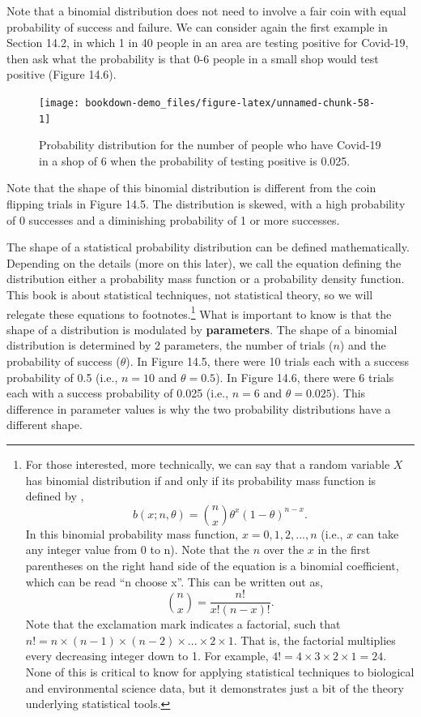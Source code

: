 \documentclass[
]{scrbook}
\begin{document}
Note that a binomial distribution does not need to involve a fair coin with equal probability of success and failure.
We can consider again the first example in Section 14.2, in which 1 in 40 people in an area are testing positive for Covid-19, then ask what the probability is that 0-6 people in a small shop would test positive (Figure 14.6).

\begin{figure}
\texttt{[image: bookdown-demo\_files/figure-latex/unnamed-chunk-58-1]} \caption{Probability distribution for the number of people who have Covid-19 in a shop of 6 when the probability of testing positive is 0.025.}\label{fig:unnamed-chunk-58}
\end{figure}

Note that the shape of this binomial distribution is different from the coin flipping trials in Figure 14.5.
The distribution is skewed, with a high probability of 0 successes and a diminishing probability of 1 or more successes.

The shape of a statistical probability distribution can be defined mathematically.
Depending on the details (more on this later), we call the equation defining the distribution either a probability mass function or a probability density function.
This book is about statistical techniques, not statistical theory, so we will relegate these equations to footnotes.\footnote{For those interested, more technically, we can say that a random variable \(X\) has binomial distribution if and only if its probability mass function is defined by \citep{Miller2004}, \[b \left(x; n, \theta \right) = {n \choose x} \theta^{x} \left(1 - \theta\right)^{n-x}.\] In this binomial probability mass function, \(x = 0, 1, 2, ..., n\) (i.e., \(x\) can take any integer value from 0 to n). Note that the \(n\) over the \(x\) in the first parentheses on the right hand side of the equation is a binomial coefficient, which can be read ``n choose x''. This can be written out as, \[{n \choose x} = \frac{n!}{x!(n - x)!}.\] Note that the exclamation mark indicates a factorial, such that \(n! = n \times (n-1) \times (n - 2) \times ... \times 2 \times 1\). That is, the factorial multiplies every decreasing integer down to 1. For example, \(4! = 4 \times 3 \times 2 \times 1 = 24\). None of this is critical to know for applying statistical techniques to biological and environmental science data, but it demonstrates just a bit of the theory underlying statistical tools.}
What is important to know is that the shape of a distribution is modulated by \textbf{parameters}.
The shape of a binomial distribution is determined by 2 parameters, the number of trials (\(n\)) and the probability of success (\(\theta\)).
In Figure 14.5, there were 10 trials each with a success probability of 0.5 (i.e., \(n = 10\) and \(\theta = 0.5\)).
In Figure 14.6, there were 6 trials each with a success probability of 0.025 (i.e., \(n = 6\) and \(\theta = 0.025\)).
This difference in parameter values is why the two probability distributions have a different shape.
\end{document}
